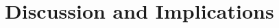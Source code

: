 \documentclass[twoside,twocolumn]{article}
\begin{document}
\section{Discussion and Implications}

\blindtext %


\begin{flushleft}
\end{flushleft}

\end{document}
